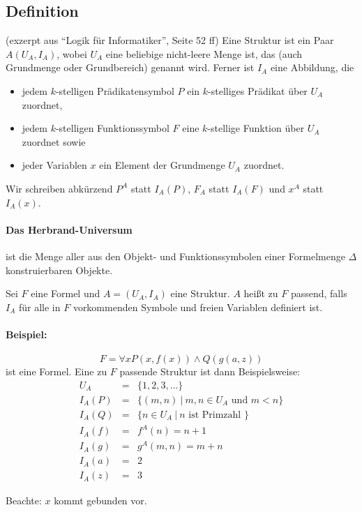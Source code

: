 \documentclass[a4paper,twoside,DIV15,BCOR12mm]{scrbook}
\begin{document}
\subsection{Definition}
(exzerpt aus ``Logik für Informatiker'', Seite 52 ff)
Eine Struktur ist ein Paar $A(U_A,I_A)$, wobei $U_A$ eine beliebige nicht-leere Menge ist, das  (auch Grundmenge oder Grundbereich) genannt wird. Ferner ist $I_A$ eine Abbildung, die
\begin{itemize}
\item jedem $k$-stelligen Prädikatensymbol $P$ ein $k$-stelliges Prädikat über $U_A$ zuordnet,
\item jedem $k$-stelligen Funktionssymbol $F$ eine $k$-stellige Funktion über $U_A$ zuordnet sowie
\item jeder Variablen $x$ ein Element der Grundmenge $U_A$ zuordnet.
\end{itemize}
Wir schreiben abkürzend $P^A$ statt $I_A(P)$, $F_A$ statt $I_A(F)$ und $x^A$ statt $I_A(x)$.

\paragraph{Das Herbrand-Universum} ist die Menge aller aus den Objekt- und Funktionssymbolen einer Formelmenge $\Delta$ konstruierbaren Objekte.

Sei $F$ eine Formel und $A=(U_A,I_A)$ eine Struktur. $A$ heißt zu $F$ passend, falls $I_A$ für alle in $F$ vorkommenden Symbole und freien Variablen definiert ist.


\paragraph{Beispiel:} $$F = \forall x P(x,f(x)) \wedge Q(g(a,z))$$ ist eine Formel. Eine zu $F$ passende Struktur ist dann Beispielsweise:
\begin{eqnarray*}
U_A &=& \{1,2,3,\ldots\} \\
I_A(P) &=& \{ (m,n)\ |\ m,n \in U_A \text{ und } m<n\} \\
I_A(Q) &=& \{ n\in U_A\ |\ n \text{ ist Primzahl }\} \\
I_A(f) &=& f^A(n) = n+1 \\
I_A(g) &=& g^A(m,n) = m+n \\
I_A(a) &=& 2 \\
I_A(z) &=& 3
\end{eqnarray*}

Beachte: $x$ kommt gebunden vor.
\end{document}
